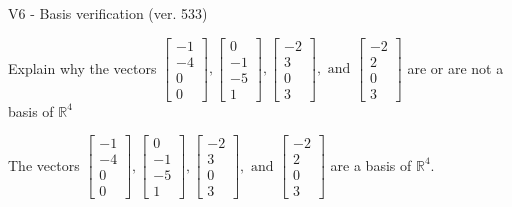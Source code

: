 \begin{exercise}
  \begin{exerciseTitle}V6 - Basis verification (ver. 533)\end{exerciseTitle}
  \begin{exerciseStatement}
    Explain why the vectors \(\left[\begin{array}{r}
-1 \\
-4 \\
0 \\
0
\end{array}\right] , \left[\begin{array}{r}
0 \\
-1 \\
-5 \\
1
\end{array}\right] , \left[\begin{array}{r}
-2 \\
3 \\
0 \\
3
\end{array}\right] , \text{ and } \left[\begin{array}{r}
-2 \\
2 \\
0 \\
3
\end{array}\right]\) are or are not a basis of \(\mathbb{R}^4\)	


  \end{exerciseStatement}
  \begin{exerciseAnswer}
   The vectors \(\left[\begin{array}{r}
-1 \\
-4 \\
0 \\
0
\end{array}\right] , \left[\begin{array}{r}
0 \\
-1 \\
-5 \\
1
\end{array}\right] , \left[\begin{array}{r}
-2 \\
3 \\
0 \\
3
\end{array}\right] , \text{ and } \left[\begin{array}{r}
-2 \\
2 \\
0 \\
3
\end{array}\right]\) 
  	 are  a basis of \(\mathbb{R}^4\).
  


  \end{exerciseAnswer}
\end{exercise}